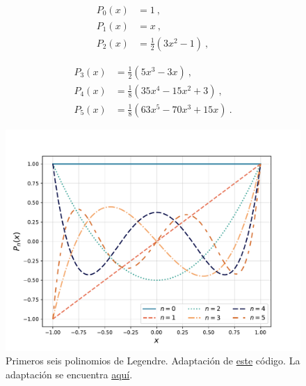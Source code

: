 \begin{minipage}[b]{.45\textwidth}
    \begin{align*}
        P_0(x) & = 1 \ , \phantom{\frac{1}{2}} \\
        P_1(x) & = x \ , \phantom{\frac{1}{2}} \\
        P_2(x) & = \frac{1}{2}(3x^2 - 1) \ ,
    \end{align*}
\end{minipage}
\hfill
\begin{minipage}[b]{.45\textwidth}
    \begin{align*}
        P_3(x) & = \frac{1}{2}(5x^3 - 3x) \ , \\
        P_4(x) & = \frac{1}{8}(35x^4 - 15x^2 + 3) \ , \\
        P_5(x) & = \frac{1}{8}(63x^5 - 70x^3 + 15x) \ . 
    \end{align*}
\end{minipage}

\begin{figure}[htbp]
    \centering
    \includegraphics[width=12cm]{./Figuras/Legendre-Polynomials.pdf}
    \caption{Primeros seis polinomios de Legendre. Adaptación de \href{https://github.com/gfrubi/FM2/blob/master/figuras-editables/fig-Legendre.py}{este} código. La adaptación se encuentra \href{aa}{aquí}.}
    \label{fig:Legendre}
\end{figure}

